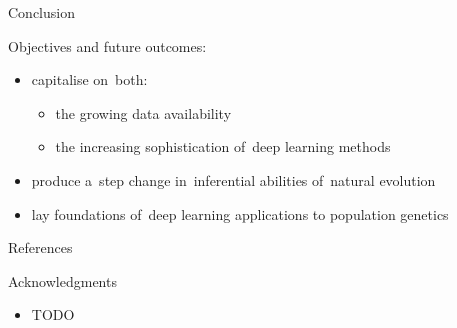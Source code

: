 \documentclass[final,hyperref={pdfpagelabels=false}]{beamer}
\begin{document}
\begin{frame}[t]
\begin{columns}[t]
\begin{column}{.465\textwidth}
\begin{block}{Conclusion}

Objectives and future outcomes:
\begin{itemize}
\item capitalise on~both:
\begin{itemize}
    \item the growing data availability 
    \item the increasing sophistication of~deep learning methods
\end{itemize}

\item produce a~step change in~inferential abilities of~natural evolution

\item lay foundations of~deep learning applications to population genetics
\end{itemize}

\end{block}


\begin{block}{References}
\small{
}

\end{block}


\begin{block}{Acknowledgments}

\begin{itemize}
\item TODO
\end{itemize}

\end{block}



\end{column}
\end{columns}
\end{frame}
\end{document}
